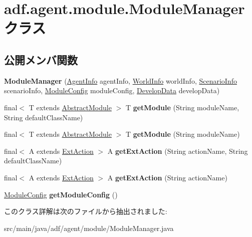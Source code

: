 \hypertarget{classadf_1_1agent_1_1module_1_1ModuleManager}{}\section{adf.\+agent.\+module.\+Module\+Manager クラス}
\label{classadf_1_1agent_1_1module_1_1ModuleManager}
\subsection*{公開メンバ関数}
\begin{DoxyCompactItemize}
\item 
\hypertarget{classadf_1_1agent_1_1module_1_1ModuleManager_ac16f2c9e14069d9b77054a12e5b58b15}{}\label{classadf_1_1agent_1_1module_1_1ModuleManager_ac16f2c9e14069d9b77054a12e5b58b15} 
{\bfseries Module\+Manager} (\hyperlink{classadf_1_1agent_1_1info_1_1AgentInfo}{Agent\+Info} agent\+Info, \hyperlink{classadf_1_1agent_1_1info_1_1WorldInfo}{World\+Info} world\+Info, \hyperlink{classadf_1_1agent_1_1info_1_1ScenarioInfo}{Scenario\+Info} scenario\+Info, \hyperlink{classadf_1_1agent_1_1config_1_1ModuleConfig}{Module\+Config} module\+Config, \hyperlink{classadf_1_1agent_1_1develop_1_1DevelopData}{Develop\+Data} develop\+Data)
\item 
\hypertarget{classadf_1_1agent_1_1module_1_1ModuleManager_a53d335af22bbe454bd59eab127e5f0d0}{}\label{classadf_1_1agent_1_1module_1_1ModuleManager_a53d335af22bbe454bd59eab127e5f0d0} 
final$<$ T extends \hyperlink{classadf_1_1component_1_1module_1_1AbstractModule}{Abstract\+Module} $>$ T {\bfseries get\+Module} (String module\+Name, String default\+Class\+Name)
\item 
\hypertarget{classadf_1_1agent_1_1module_1_1ModuleManager_a97f961775277112b300c281b55b2571f}{}\label{classadf_1_1agent_1_1module_1_1ModuleManager_a97f961775277112b300c281b55b2571f} 
final$<$ T extends \hyperlink{classadf_1_1component_1_1module_1_1AbstractModule}{Abstract\+Module} $>$ T {\bfseries get\+Module} (String module\+Name)
\item 
\hypertarget{classadf_1_1agent_1_1module_1_1ModuleManager_aac7c21a99087d5b2c48aa911193c3c14}{}\label{classadf_1_1agent_1_1module_1_1ModuleManager_aac7c21a99087d5b2c48aa911193c3c14} 
final$<$ A extends \hyperlink{classadf_1_1component_1_1extaction_1_1ExtAction}{Ext\+Action} $>$ A {\bfseries get\+Ext\+Action} (String action\+Name, String default\+Class\+Name)
\item 
\hypertarget{classadf_1_1agent_1_1module_1_1ModuleManager_a48a8feb81aaa7919db45ead57662c621}{}\label{classadf_1_1agent_1_1module_1_1ModuleManager_a48a8feb81aaa7919db45ead57662c621} 
final$<$ A extends \hyperlink{classadf_1_1component_1_1extaction_1_1ExtAction}{Ext\+Action} $>$ A {\bfseries get\+Ext\+Action} (String action\+Name)
\item 
\hypertarget{classadf_1_1agent_1_1module_1_1ModuleManager_aea388134b8a03bf6237eb5874da9e095}{}\label{classadf_1_1agent_1_1module_1_1ModuleManager_aea388134b8a03bf6237eb5874da9e095} 
\hyperlink{classadf_1_1agent_1_1config_1_1ModuleConfig}{Module\+Config} {\bfseries get\+Module\+Config} ()
\end{DoxyCompactItemize}


このクラス詳解は次のファイルから抽出されました\+:\begin{DoxyCompactItemize}
\item 
src/main/java/adf/agent/module/Module\+Manager.\+java\end{DoxyCompactItemize}
